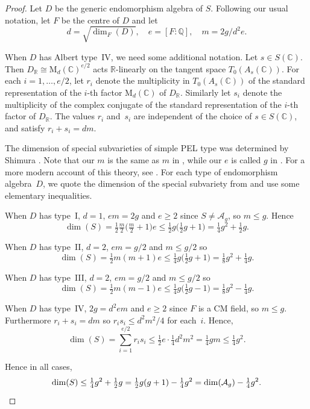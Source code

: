 \documentclass[JEP,XML,SOM,Unicode,NoFloatCountersInSection]{cedram}
\newcommand{\bC}{\mathbb{C}}
\newcommand{\bQ}{\mathbb{Q}}
\newcommand{\bR}{\mathbb{R}}
\newcommand{\Ag}{\mathcal{A}_g}
\newcommand{\rM}{\mathrm{M}}
\begin{document}
\begin{proof}
Let $D$ be the generic endomorphism algebra of $S$. Following our usual notation, let $F$ be the centre of $D$ and let
\[
d = \sqrt{\dim_F(D)}, \quad e = [F:\bQ], \quad m = 2g/d^2e.
\]

When $D$ has Albert type~IV, we need some additional notation.
Let $s \in S(\bC)$.
Then $D_\bR \cong \rM_d(\bC)^{e/2}$ acts $\bR$-linearly on the tangent space $T_0(A_s(\bC))$.
For each $i = 1, \dotsc, e/2$, let $r_i$ denote the multiplicity in $T_0(A_s(\bC))$ of the standard representation of the $i$-th factor $\rM_d(\bC)$ of $D_\bR$.
Similarly let $s_i$ denote the multiplicity of the complex conjugate of the standard representation of the $i$-th factor of $D_\bR$.
The values $r_i$ and~$s_i$ are independent of the choice of $s \in S(\bC)$, and satisfy $r_i + s_i = dm$.

The dimension of special subvarieties of simple PEL type was determined by Shimura \cite[4.1]{Shi63}.
Note that our $m$ is the same as $m$ in \cite{Shi63}, while our $e$ is called $g$ in \cite{Shi63}.
For a more modern account of this theory, see \cite[Chap.\,9]{BL04}.
For each type of endomorphism algebra~$D$, we quote the dimension of the special subvariety from \cite[4.1]{Shi63} and use some elementary inequalities.

When $D$ has type~I, $d=1$, $em = 2g$ and $e \geq 2$ since $S \neq \Ag$, so $m \leq g$.
Hence
\[
\dim(S) = \tfrac{1}{2} \tfrac{m}{2} \bigl( \tfrac{m}{2} + 1 \bigr)e
\leq \tfrac{1}{2} g \bigl( \tfrac{1}{2}g + 1 \bigr) = \tfrac{1}{4}g^2 + \tfrac{1}{2}g.
\]

When $D$ has type~II, $d=2$, $em = g/2$ and $m \leq g/2$ so
\[
\dim(S) = \tfrac{1}{2} m(m+1)e
\leq \tfrac{1}{4}g \bigl( \tfrac{1}{2}g + 1 \bigr) = \tfrac{1}{8}g^2 + \tfrac{1}{4}g.
\]

When $D$ has type~III, $d=2$, $em = g/2$ and $m \leq g/2$ so
\[
\dim(S) = \tfrac{1}{2} m(m-1)e
\leq \tfrac{1}{4}g \bigl( \tfrac{1}{2}g - 1 \bigr) = \tfrac{1}{8}g^2 - \tfrac{1}{4}g.
\]

When $D$ has type~IV, $2g = d^2em$ and $e \geq 2$ since $F$ is a CM field, so $m \leq g$.
Furthermore $r_i + s_i = dm$ so $r_is_i \leq d^2m^2/4$ for each~$i$.
Hence,
\[
\dim(S) = \sum_{i=1}^{e/2} r_i s_i \leq \tfrac{1}{2}e \cdot \tfrac{1}{4}d^2m^2 = \tfrac{1}{4}gm \leq \tfrac{1}{4}g^2.
\]

Hence in all cases,
\[
\dim(S) \leq \tfrac{1}{4}g^2 + \tfrac{1}{2}g = \tfrac{1}{2}g(g+1) - \tfrac{1}{4}g^2 = \dim(\Ag) - \tfrac{1}{4}g^2.
\qedhere
\]
\end{proof}
\end{document}
